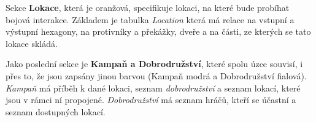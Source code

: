 Sekce \textbf{Lokace}, která je oranžová, specifikuje lokaci, na které bude probíhat bojová interakce. Základem je tabulka \textit{Location} která má relace na vstupní a výstupní hexagony, na protivníky a překážky, dveře a na části, ze kterých se tato lokace skládá. 

Jako poslední sekce je \textbf{Kampaň a Dobrodružství}, které spolu úzce souvisí, i přes to, že jsou zapsány jinou barvou (Kampaň modrá a Dobrodružství fialová). \textit{Kampaň} má příběh k dané lokaci, seznam \textit{dobrodružství} a seznam lokací, které jsou v rámci ní propojené. \textit{Dobrodružství} má seznam hráčů, kteří se účastní a seznam dostupných lokací.

